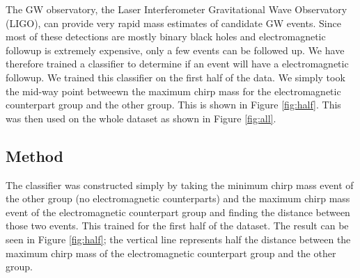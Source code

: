 The GW observatory, the Laser Interferometer Gravitational Wave Observatory (LIGO), can provide very rapid mass estimates of candidate GW events. Since most of these detections are mostly binary black holes and electromagnetic followup is extremely expensive, only a few events can be followed up. We have therefore trained a classifier to determine if an event will have a electromagnetic followup. We trained this classifier on the first half of the data. We simply took the mid-way point betweewn the maximum chirp mass for the electromagnetic counterpart group and the other group. This is shown in Figure \ref{fig:half}. This was then used on the whole dataset as shown in Figure \ref{fig:all}.

\subsection{Method}
The classifier was constructed simply by taking the minimum chirp mass event of the other group (no electromagnetic counterparts) and the maximum chirp mass event of the electromagnetic counterpart group and finding the distance between those two events. This trained for the first half of the dataset. The result can be seen in Figure \ref{fig:half}; the vertical line represents half the distance between the maximum chirp mass of the electromagnetic counterpart group and the other group.

